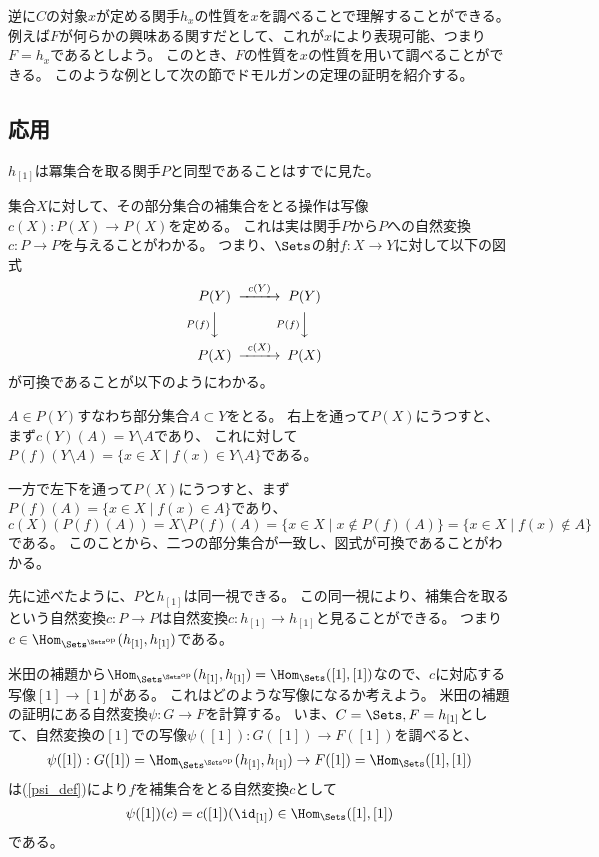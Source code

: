 \documentclass[uplatex]{jsarticle}
\begin{document}
逆に$C$の対象$x$が定める関手$h_x$の性質を$x$を調べることで理解することができる。
例えば$F$が何らかの興味ある関すだとして、これが$x$により表現可能、つまり$F=h_x$であるとしよう。
このとき、$F$の性質を$x$の性質を用いて調べることができる。
このような例として次の節でドモルガンの定理の証明を紹介する。

\subsection{応用}
$h_{[1]}$は冪集合を取る関手$P$と同型であることはすでに見た。

集合$X$に対して、その部分集合の補集合をとる操作は写像$c(X):P(X)\to P(X)$を定める。
これは実は関手$P$から$P$への自然変換$c:P \to P$を与えることがわかる。
つまり、$\Sets$の射$f:X \to Y$に対して以下の図式
\begin{align*}
\begin{CD}
P(Y)@>c(Y)>>P(Y)\\
@VP(f)VV@VP(f)VV\\
P(X)@>c(X)>>P(X)
\end{CD}
\end{align*}
が可換であることが以下のようにわかる。

$A \in P(Y)$すなわち部分集合$A\subset Y$をとる。
右上を通って$P(X)$にうつすと、まず$c(Y)(A)=Y \setminus A$であり、
これに対して$P(f)(Y\setminus A)=\{x \in X \mid f(x) \in Y \setminus A\}$である。

一方で左下を通って$P(X)$にうつすと、まず$P(f)(A)=\{x \in X \mid f(x) \in A\}$であり、
$c(X)(P(f)(A))=X \setminus P(f)(A)=\{x \in X \mid x \notin P(f)(A)\}=\{x \in X \mid f(x) \notin A\} $である。
このことから、二つの部分集合が一致し、図式が可換であることがわかる。

\vspace{10pt}
先に述べたように、$P$と$h_{[1]}$は同一視できる。
この同一視により、補集合を取るという自然変換$c:P \to P$は自然変換$c:h_{[1]} \to h_{[1]}$と見ることができる。
つまり$c\in\Hom_{\Sets^{\Sets^{\rm op}}}(h_{[1]},h_{[1]})$である。

米田の補題から$\Hom_{\Sets^{\Sets^{\rm op}}}(h_{[1]},h_{[1]})=\Hom_{\Sets}([1],[1])$なので、$c$に対応する写像$[1]\to [1]$がある。
これはどのような写像になるか考えよう。
米田の補題の証明にある自然変換$\psi:G \to F$を計算する。
いま、$C=\Sets, F=h_{[1]}$として、自然変換の$[1]$での写像$\psi([1]):G([1]) \to F([1])$を調べると、
\begin{align*}
\psi([1]):G([1])=\Hom_{\Sets^{\Sets^{\rm op}}}(h_{[1]},h_{[1]}) \to F([1])=\Hom_{\Sets}([1],[1])
\end{align*}
は(\ref{psi_def})により$f$を補集合をとる自然変換$c$として
\begin{align*}
\psi([1])(c)=c([1])(\id_{[1]})\in\Hom_{\Sets}([1],[1])
\end{align*}
である。
\end{document}
